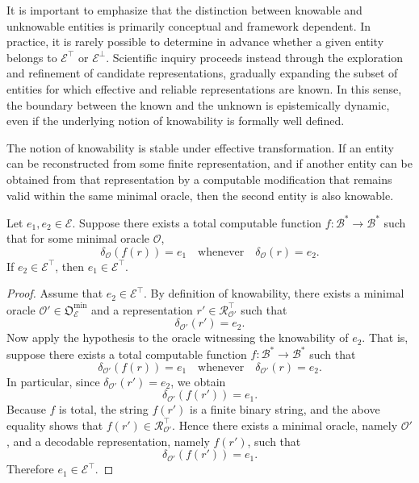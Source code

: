 It is important to emphasize that the distinction between knowable and unknowable entities is primarily conceptual and framework dependent. In practice, it is rarely possible to determine in advance whether a given entity belongs to $\mathcal{E}^{\top}$ or $\mathcal{E}^{\bot}$. Scientific inquiry proceeds instead through the exploration and refinement of candidate representations, gradually expanding the subset of entities for which effective and reliable representations are known. In this sense, the boundary between the known and the unknown is epistemically dynamic, even if the underlying notion of knowability is formally well defined.

The notion of knowability is stable under effective transformation. If an entity can be reconstructed from some finite representation, and if another entity can be obtained from that representation by a computable modification that remains valid within the same minimal oracle, then the second entity is also knowable.

\begin{proposition}
Let $e_1, e_2 \in \mathcal{E}$. Suppose there exists a total computable function
$f:\mathcal{B}^\ast \to \mathcal{B}^\ast$ such that for some minimal oracle $\mathcal{O}$,
\[
\delta_{\mathcal O}(f(r)) = e_1 \quad\text{whenever}\quad \delta_{\mathcal O}(r) = e_2.
\]
If $e_2 \in \mathcal{E}^{\top}$, then $e_1 \in \mathcal{E}^{\top}$.
\end{proposition}

\begin{proof}
Assume that $e_2 \in \mathcal{E}^{\top}$. By definition of knowability, there exists a minimal oracle $\mathcal{O}' \in \mathfrak{O}_{\mathcal{E}}^{\min}$ and a representation $r' \in \mathcal{R}^{\top}_{\mathcal{O}'}$ such that
\[
\delta_{\mathcal O'}(r') = e_2.
\]
Now apply the hypothesis to the oracle witnessing the knowability of $e_2$. That is, suppose there exists a total computable function
$f:\mathcal{B}^\ast \to \mathcal{B}^\ast$
such that
\[
\delta_{\mathcal O'}(f(r)) = e_1
\quad\text{whenever}\quad
\delta_{\mathcal O'}(r) = e_2.
\]
In particular, since $\delta_{\mathcal O'}(r') = e_2$, we obtain
\[
\delta_{\mathcal O'}(f(r')) = e_1.
\]
Because $f$ is total, the string $f(r')$ is a finite binary string, and the above equality shows that $f(r') \in \mathcal{R}^{\top}_{\mathcal{O}'}$. Hence there exists a minimal oracle, namely $\mathcal{O}'$, and a decodable representation, namely $f(r')$, such that
\[
\delta_{\mathcal O'}(f(r')) = e_1.
\]
Therefore $e_1 \in \mathcal{E}^{\top}$.
\end{proof}

